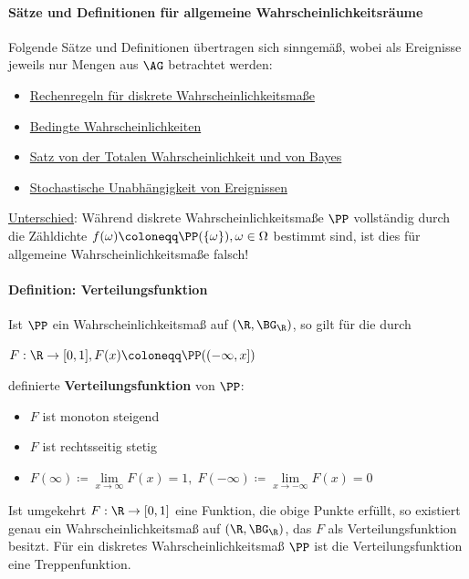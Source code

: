 \newpage
\paragraph{Sätze und Definitionen für allgemeine Wahrscheinlichkeitsräume}
Folgende Sätze und Definitionen übertragen sich sinngemäß, wobei als Ereignisse jeweils nur Mengen aus $\AG$ betrachtet werden:
\begin{itemize}
	\item \hyperref[rules]{Rechenregeln für diskrete Wahrscheinlichkeitsmaße}
	\item \hyperref[conditioned]{Bedingte Wahrscheinlichkeiten}
	\item \hyperref[bayes]{Satz von der Totalen Wahrscheinlichkeit und von Bayes}
	\item \hyperref[independant]{Stochastische Unabhängigkeit von Ereignissen}
\end{itemize}
\underline{Unterschied}: Während diskrete Wahrscheinlichkeitsmaße $\PP$ vollständig durch die Zähldichte $f(\omega)\coloneqq\PP(\{\omega\}),\omega\in\Omega$ bestimmt sind, ist dies für allgemeine Wahrscheinlichkeitsmaße falsch!

\paragraph{Definition: Verteilungsfunktion}
Ist $\PP$ ein Wahrscheinlichkeitsmaß auf $(\R,\BG_{\R})$, so gilt für die durch
\begin{tightcenter}
	$F:\R\rightarrow[0,1], F(x)\coloneqq\PP((-\infty,x])$
\end{tightcenter}
definierte \textbf{Verteilungsfunktion} von $\PP$:
\begin{itemize}
	\item $F$ ist monoton steigend
	\item $F$ ist rechtsseitig stetig
	\item $F(\infty)\coloneqq\lim\limits_{x\rightarrow\infty}F(x)=1, \; F(-\infty)\coloneqq\lim\limits_{x\rightarrow-\infty}F(x)=0$
\end{itemize}
Ist umgekehrt $F:\R\rightarrow[0,1]$ eine Funktion, die obige Punkte erfüllt, so existiert genau ein Wahrscheinlichkeitsmaß auf $(\R,\BG_{\R})$, das $F$ als Verteilungsfunktion besitzt.
Für ein diskretes Wahrscheinlichkeitsmaß $\PP$ ist die Verteilungsfunktion eine Treppenfunktion.

